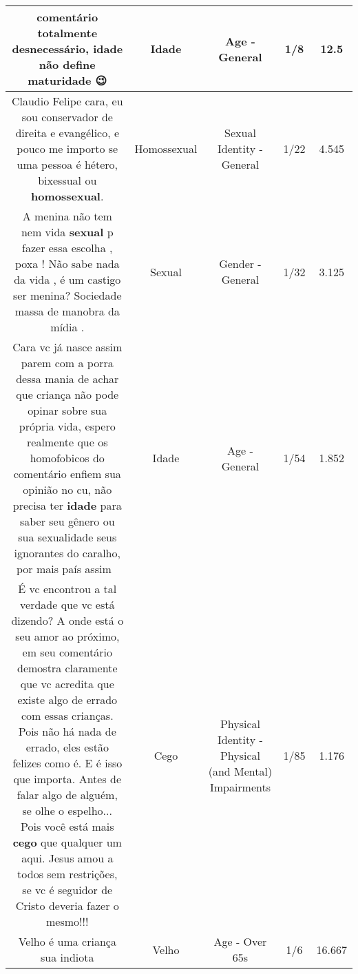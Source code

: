 \documentclass[11pt]{article}
\newlength\mylength
\begin{document}
\begin{center}
\begin{longtable}{|C{.65\mylength}|C{.30\mylength}|C{.12\mylength}|C{.12\mylength}|C{.12\mylength}|}
  \small comentário totalmente desnecessário, \textbf{idade} não define maturidade 😉\normalsize   & Idade & Age - General & 1/8 & 12.5 \\  \hline
  \small Claudio Felipe cara, eu sou conservador de direita e evangélico, e pouco me importo se uma pessoa é hétero, bixessual ou \textbf{homossexual}.\normalsize   & Homossexual & Sexual Identity - General & 1/22 & 4.545 \\  \hline
  \small A menina não tem nem vida \textbf{sexual} p fazer essa escolha , poxa ! Não sabe nada da vida , é um castigo ser menina? Sociedade massa de manobra da mídia .\normalsize   & Sexual & Gender - General & 1/32 & 3.125 \\  \hline
  \small Cara vc já nasce assim parem com a porra dessa mania de achar que criança não pode opinar sobre sua própria vida, espero realmente que os homofobicos do comentário enfiem sua opinião no cu, não precisa ter \textbf{idade} para saber seu gênero ou sua sexualidade seus ignorantes do caralho, por mais país assim 👏\normalsize   & Idade & Age - General & 1/54 & 1.852 \\  \hline
  \small É vc encontrou a tal verdade que vc está dizendo? A onde está o seu amor ao próximo, em seu comentário demostra claramente que vc acredita que existe algo de errado com essas crianças. Pois não há nada de errado, eles estão felizes como é. E é isso que importa. Antes de falar algo de alguém, se olhe o espelho... Pois você está mais \textbf{cego} que qualquer um aqui. Jesus amou a todos sem restrições, se vc é seguidor de Cristo deveria fazer o mesmo!!!\normalsize   & Cego & Physical Identity - Physical (and Mental) Impairments & 1/85 & 1.176 \\  \hline
  \small Velho é uma criança sua indiota\normalsize   & Velho & Age - Over 65s & 1/6 & 16.667 \\  \hline

\end{longtable}
\end{center}
\end{document}
